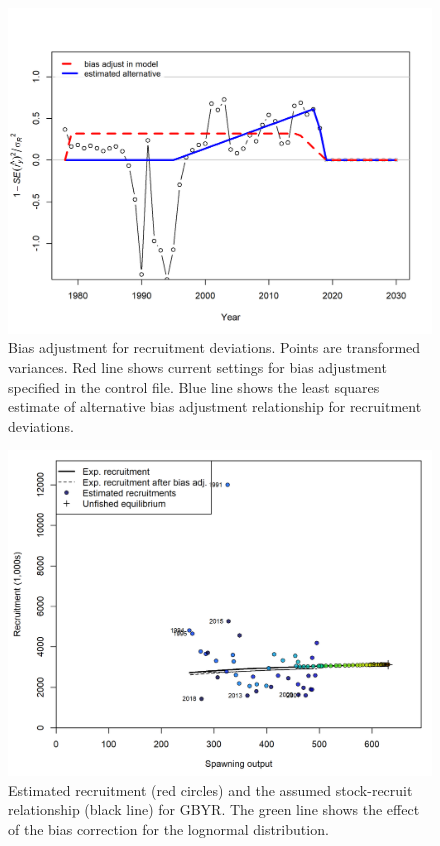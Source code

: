 \documentclass[12pt,]{article}
\begin{document}
\begin{figure}
\centering
\includegraphics{r4ss/plots_mod1/recruit_fit_bias_adjust.png}
\caption{Bias adjustment for recruitment deviations. Points are
transformed variances. Red line shows current settings for bias
adjustment specified in the control file. Blue line shows the least
squares estimate of alternative bias adjustment relationship for
recruitment deviations. \label{fig:recruit_fit_bias_adjust}}
\end{figure}

\begin{figure}
\centering
\includegraphics{r4ss/plots_mod1/SR_curve2.png}
\caption{Estimated recruitment (red circles) and the assumed
stock-recruit relationship (black line) for GBYR. The green line shows
the effect of the bias correction for the lognormal distribution.
\label{fig:SR_curve2}}
\end{figure}
\end{document}
